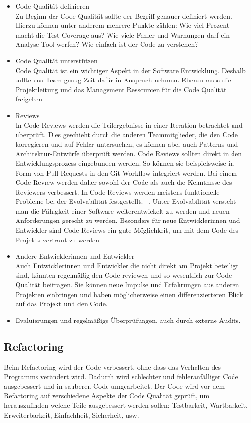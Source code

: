 \begin{itemize} 
\item Code Qualität definieren \\
Zu Beginn der Code Qualität sollte der Begriff genauer definiert werden. Hierzu können unter anderem mehrere Punkte zählen: Wie viel Prozent macht die Test Coverage aus? Wie viele Fehler und Warnungen darf ein Analyse-Tool werfen? Wie einfach ist der Code zu verstehen? 
\item Code Qualität unterstützen \\
Code Qualität ist ein wichtiger Aspekt in der Software Entwicklung. Deshalb sollte das Team genug Zeit dafür in Anspruch nehmen. Ebenso muss die Projektleitung und das Management Ressourcen für die Code Qualität freigeben.
\item Reviews \\
In Code Reviews werden die Teilergebnisse in einer Iteration betrachtet und überprüft. Dies geschieht durch die anderen Teammitglieder, die den Code korregieren und auf Fehler untersuchen, es können aber auch Patterns und Architektur-Entwürfe überprüft werden. Code Reviews sollten direkt in den Entwicklungsprozess eingebunden werden. So können sie beispielsweise in Form von Pull Requests in den Git-Workflow integriert werden. Bei einem Code Review werden daher sowohl der Code als auch die Kenntnisse des Reviewers verbessert. 
In Code Reviews werden meistens funktionelle Probleme bei der Evolvabilität festgestellt. ~\parencite{mantyla2008types}. Unter Evolvabilität versteht man die Fähigkeit einer Software weiterentwickelt zu werden und neuen Anforderungen gerecht zu werden. Besonders für neue Entwicklerinnen und Entwickler sind Code Reviews ein gute Möglichkeit, um mit dem Code des Projekts vertraut zu werden.
\item Andere Entwicklerinnen und Entwickler \\
Auch Entwicklerinnen und Entwickler die nicht direkt am Projekt beteiligt sind, könnten regelmäßig den Code reviewen und so wesentlich zur Code Qualität beitragen. Sie können neue Impulse und Erfahrungen aus anderen Projekten einbringen und haben möglicherweise einen differenzierteren Blick auf das Projekt und den Code. 
\item Evaluierungen und regelmäßige Überprüfungen, auch durch externe Audits. 
\end{itemize}
\subsection{Refactoring}
Beim Refactoring wird der Code verbessert, ohne dass das Verhalten des Programms verändert wird. Dadurch wird schlechter und fehleranfälliger Code ausgebessert und in sauberen Code umgearbeitet. Der Code wird vor dem Refactoring auf verschiedene Aspekte der Code Qualität geprüft, um herauszufinden welche Teile ausgebessert werden sollen: Testbarkeit, Wartbarkeit, Erweiterbarkeit, Einfachheit, Sicherheit, usw.  ~\parencite{fowler2018refactoring} 
